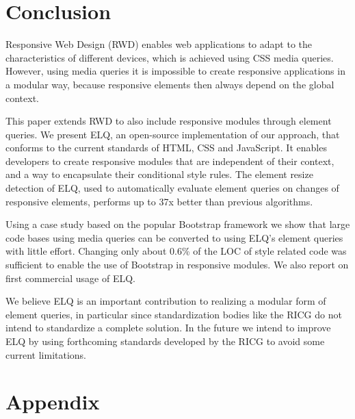 \documentclass{llncs}
\newcommand{\elq}{ELQ}
\newcommand{\comment}[1]{}
\begin{document}
\section{Conclusion}\label{sec:conclusion}
  Responsive Web Design (RWD) enables web applications to adapt to the characteristics of different devices, which is achieved using CSS media queries.
  However, using media queries it is impossible to create responsive applications in a modular way, because responsive elements then always depend on the global context.

  This paper extends RWD to also include responsive modules through element queries.
  We present \elq{}, an open-source implementation of our approach, that conforms to the current standards of HTML, CSS and JavaScript.
  It enables developers to create responsive modules that are independent of their context, and a way to encapsulate their conditional style rules.
  The element resize detection of \elq{}, used to automatically evaluate element queries on changes of responsive elements, performs up to 37x better than previous algorithms.

  Using a case study based on the popular Bootstrap framework we show that large code bases using media queries can be converted to using \elq{}'s element queries with little effort.
  Changing only about 0.6\% of the LOC of style related code was sufficient to enable the use of Bootstrap in responsive modules.
  We also report on first commercial usage of \elq{}.

  We believe \elq{} is an important contribution to realizing a modular form of element queries, in particular since standardization bodies like the RICG do not intend to standardize a complete solution.
  In the future we intend to improve \elq{} by using forthcoming standards developed by the RICG to avoid some current limitations.


\comment{
\subsubsection*{Acknowledgments.}
The authors would like to thank EVRY for sponsoring the \elq{} project including the supporting projects for element resize detection and batch processing.
}



\newpage
\appendix
\section{Appendix}
\end{document}
